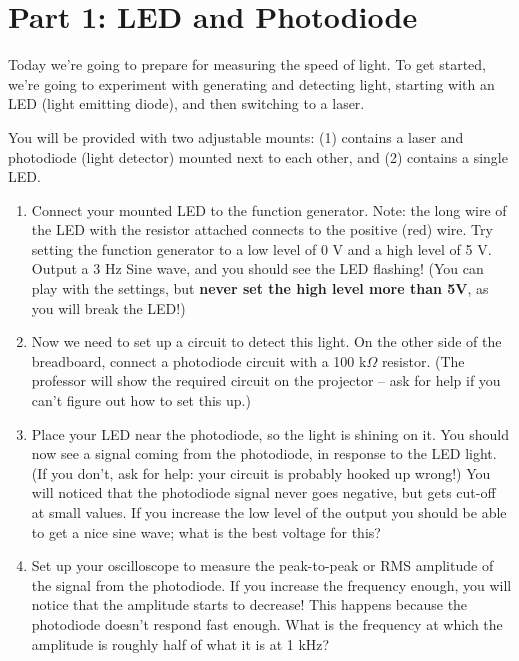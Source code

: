 \documentclass[12pt, letterpaper]{article}
\begin{document}
\normalsize

\section{Part 1: LED and Photodiode}

Today we're going to prepare for measuring the speed of light.
To get started, we're going to experiment with generating and detecting light, starting with an LED (light emitting diode), and then switching to a laser.

You will be provided with two adjustable mounts: (1) contains a laser and photodiode (light detector) mounted next to each other, and (2) contains a single LED.

\begin{enumerate}
	\item Connect your mounted LED to the function generator.
	Note: the long wire of the LED with the resistor attached connects to the positive (red) wire.
	Try setting the function generator to a low level of 0 V and a high level of 5 V.
	Output a 3 Hz Sine wave, and you should see the LED flashing!  (You can play with the settings, but \textbf{never set the high level more than 5V}, as you will break the LED!)
	
	\item Now we need to set up a circuit to detect this light.  On the other side of the breadboard, connect a photodiode circuit with a 100 k$\Omega$ resistor.  (The professor will show the required circuit on the projector -- ask for help if you can't figure out how to set this up.)
	
	\item Place your LED near the photodiode, so the light is shining on it.
	You should now see a signal coming from the photodiode, in response to the LED light.	
	(If you don't, ask for help: your circuit is probably hooked up wrong!)
	You will noticed that the photodiode signal never goes negative, but gets cut-off at small values.
	If you increase the low level of the output you should be able to get a nice sine wave; what is the best voltage for this?
	
	\answergrid{3cm}
\item Set up your oscilloscope to measure the peak-to-peak or RMS amplitude of the signal from the photodiode.
	If you increase the frequency enough, you will notice that the amplitude starts to decrease!
	This happens because the photodiode doesn't respond fast enough.
	What is the frequency at which the amplitude is roughly half of what it is at 1 kHz?


\end{enumerate}
\end{document}
